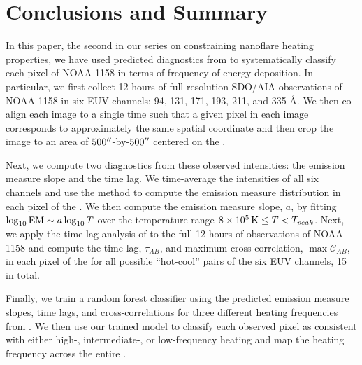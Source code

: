 \section{Conclusions and Summary}\label{sec:conclusions}

In this paper, the second in our series on constraining nanoflare heating properties, we have used predicted diagnostics from  to systematically classify each pixel of \AR{} NOAA 1158 in terms of frequency of energy deposition. In particular, we first collect 12 hours of full-resolution SDO/AIA observations of NOAA 1158 in six EUV channels: 94, 131, 171, 193, 211, and 335 \AA. We then co-align each image to a single time such that a given pixel in each image corresponds to approximately the same spatial coordinate and then crop the image to an area of $500\mbox{$^{\prime\prime}$}$-by-$500\mbox{$^{\prime\prime}$}$ centered on the \AR{}.

Next, we compute two diagnostics from these observed intensities: the emission measure slope and the time lag. We time-average the intensities of all six channels and use the method \citet{hannah_differential_2012} to compute the emission measure distribution in each pixel of the \AR{}. We then compute the emission measure slope, $a$, by fitting $\log_{10}\textup{EM}\sim a\log_{10}T$ over the temperature range $8\times10^5\,\textup{K}\le T < T_{peak}$. Next, we apply the time-lag analysis of \citet{viall_evidence_2012} to the full 12 hours of observations of NOAA 1158 and compute the time lag, $\tau_{AB}$, and maximum cross-correlation, $\max\mathcal{C}_{AB}$, in each pixel of the \AR{} for all possible ``hot-cool'' pairs of the six EUV channels, 15 in total.

Finally, we train a random forest classifier using the predicted emission measure slopes, time lags, and cross-correlations for three different heating frequencies from . We then use our trained model to classify each observed pixel as consistent with either high-, intermediate-, or low-frequency heating and map the heating frequency across the entire \AR{}.

